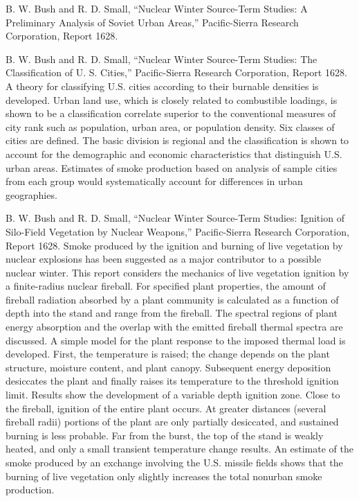 \documentclass[]{article}
\begin{document}
B. W. Bush and R. D. Small, ``Nuclear Winter Source-Term Studies: A
Preliminary Analysis of Soviet Urban Areas,'' Pacific-Sierra Research
Corporation, Report 1628.

B. W. Bush and R. D. Small, ``Nuclear Winter Source-Term Studies: The
Classification of U. S. Cities,'' Pacific-Sierra Research Corporation,
Report 1628. A theory for classifying U.S. cities according to their
burnable densities is developed. Urban land use, which is closely
related to combustible loadings, is shown to be a classification
correlate superior to the conventional measures of city rank such as
population, urban area, or population density. Six classes of cities are
defined. The basic division is regional and the classification is shown
to account for the demographic and economic characteristics that
distinguish U.S. urban areas. Estimates of smoke production based on
analysis of sample cities from each group would systematically account
for differences in urban geographies.

B. W. Bush and R. D. Small, ``Nuclear Winter Source-Term Studies:
Ignition of Silo-Field Vegetation by Nuclear Weapons,'' Pacific-Sierra
Research Corporation, Report 1628. Smoke produced by the ignition and
burning of live vegetation by nuclear explosions has been suggested as a
major contributor to a possible nuclear winter. This report considers
the mechanics of live vegetation ignition by a finite-radius nuclear
fireball. For specified plant properties, the amount of fireball
radiation absorbed by a plant community is calculated as a function of
depth into the stand and range from the fireball. The spectral regions
of plant energy absorption and the overlap with the emitted fireball
thermal spectra are discussed. A simple model for the plant response to
the imposed thermal load is developed. First, the temperature is raised;
the change depends on the plant structure, moisture content, and plant
canopy. Subsequent energy deposition desiccates the plant and finally
raises its temperature to the threshold ignition limit. Results show the
development of a variable depth ignition zone. Close to the fireball,
ignition of the entire plant occurs. At greater distances (several
fireball radii) portions of the plant are only partially desiccated, and
sustained burning is less probable. Far from the burst, the top of the
stand is weakly heated, and only a small transient temperature change
results. An estimate of the smoke produced by an exchange involving the
U.S. missile fields shows that the burning of live vegetation only
slightly increases the total nonurban smoke production.
\end{document}
